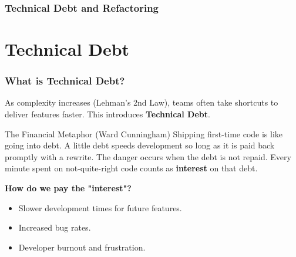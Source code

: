 \documentclass[xcolor=table]{beamer}
\begin{document}
\begin{frame}
    \frametitle{Technical Debt and Refactoring}
    \centering
\end{frame}

\section{Technical Debt}

\begin{frame}
    \frametitle{What is Technical Debt?}
    As complexity increases (Lehman's 2nd Law), teams often take shortcuts to deliver features faster. This introduces \textbf{Technical Debt}.
    
    \vspace{0.3cm}
    \begin{alertblock}{The Financial Metaphor (Ward Cunningham)}
        Shipping first-time code is like going into debt. A little debt speeds development so long as it is paid back promptly with a rewrite. The danger occurs when the debt is not repaid. Every minute spent on not-quite-right code counts as \textbf{interest} on that debt.
    \end{alertblock}
    
    \vspace{0.2cm}
    \textbf{How do we pay the "interest"?}
    \begin{itemize}
        \item Slower development times for future features.
        \item Increased bug rates.
        \item Developer burnout and frustration.
    \end{itemize}
\end{frame}
\end{document}
